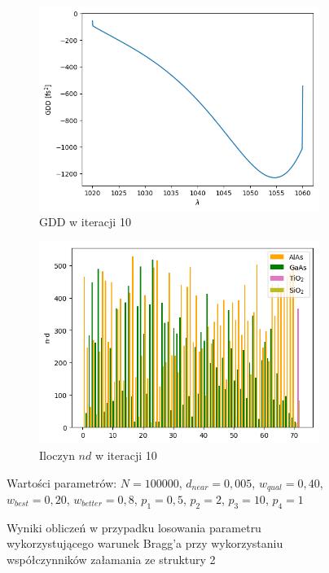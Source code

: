 \begin{figure} [H]
\begin{subfigure}[b]{0.31\textwidth}
        \includegraphics[width=\linewidth]{figures/wyniki/1stopien/opt10^5/result_gddresult10.png}
        \caption{GDD w iteracji 10}
    \end{subfigure}
        \begin{subfigure}[b]{0.32\textwidth}
        \includegraphics[width=\linewidth]{figures/wyniki/1stopien/opt10^5/result_ndresult10.png}
        \caption{Iloczyn $nd$ w iteracji 10}
    \end{subfigure}
    \caption{Wyniki obliczeń w przypadku losowania parametru wykorzystującego warunek Bragg'a przy wykorzystaniu współczynników załamania ze struktury 2}
    Wartości parametrów: $N= 100000$, $d_{near}= 0,005$, $w_{qual}=0,40$, $w_{best}=0,20$, $w_{better}=0,8$, $p_1=0,5$, $p_2=2$, $p_3=10$, $p_4=1$
    \label{fig:wyn1stpopt2}
\end{figure}

